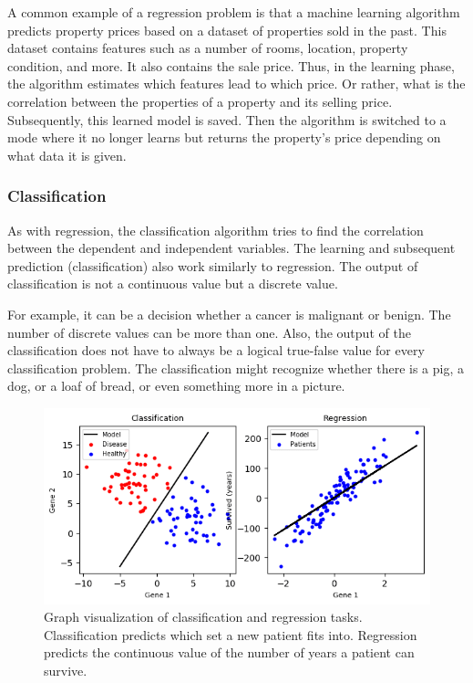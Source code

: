 A common example of a regression problem is that a machine learning algorithm predicts property prices based on a dataset of properties sold in the past. This dataset contains features such as a number of rooms, location, property condition, and more. It also contains the sale price. Thus, in the learning phase, the algorithm estimates which features lead to which price. Or rather, what is the correlation between the properties of a property and its selling price. Subsequently, this learned model is saved. Then the algorithm is switched to a mode where it no longer learns but returns the property's price depending on what data it is given.

\subsubsection{Classification}

As with regression, the classification algorithm tries to find the correlation between the dependent and independent variables. The learning and subsequent prediction (classification) also work similarly to regression. The output of classification is not a continuous value but a discrete value. 

For example, it can be a decision whether a cancer is malignant or benign. The number of discrete values can be more than one. Also, the output of the classification does not have to always be a logical true-false value for every classification problem. The classification might recognize whether there is a pig, a dog, or a loaf of bread, or even something more in a picture.

\begin{figure}[ht]
    \centering
    \includegraphics[width=1\linewidth]{media/classification-regression.png}
    \caption{Graph visualization of classification and regression tasks. Classification predicts which set a new patient fits into. Regression predicts the continuous value of the number of years a patient can survive.\cite{classification-regression}}
    \label{fig:classification-regression}
\end{figure}

